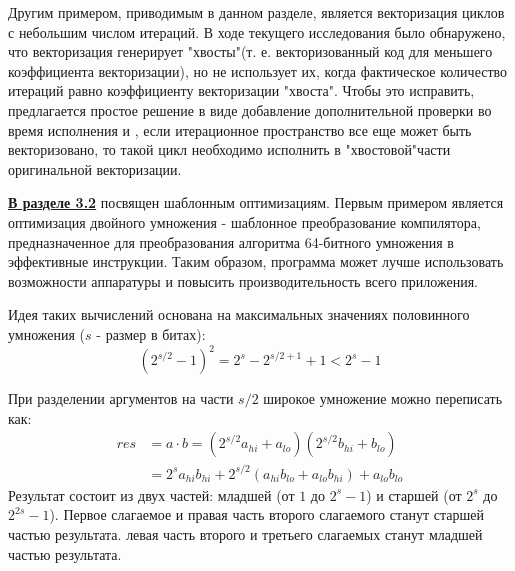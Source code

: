 Другим примером, приводимым в данном разделе, является  векторизация циклов с небольшим числом итераций.  В ходе текущего исследования было обнаружено, что векторизация
генерирует "хвосты"\phantom{ }(т. е. векторизованный код для меньшего коэффициента
векторизации), но не использует их, когда фактическое количество итераций
равно коэффициенту векторизации "хвоста".  Чтобы это исправить, предлагается простое решение в виде добавление дополнительной проверки во время исполнения и , если итерационное пространство все еще может быть векторизовано, то такой цикл необходимо исполнить в "хвостовой"\phantom{ }части оригинальной векторизации.

 \underline{\textbf{В разделе 3.2}} посвящен шаблонным  оптимизациям. Первым примером является оптимизация двойного умножения - шаблонное преобразование
 компилятора, предназначенное для преобразования алгоритма 64-битного умножения
 в эффективные инструкции. Таким образом, программа может лучше
 использовать возможности аппаратуры и повысить производительность всего
 приложения.
 
 Идея таких вычислений основана на максимальных значениях половинного умножения ($s$ - размер в битах):
 \begin{equation*} \label{eq1}
 	\left(2^{s/2}-1\right)^2=2^s-2^{s/2+1}+1<2^s-1
 \end{equation*}
 
 При разделении аргументов на части $s/2$ широкое умножение можно переписать как:
 \begin{equation*} \label{eq2}
 	\begin{split}
 		res& =a\cdot b =\left(2^{s/2}a_{hi}+a_{lo}\right)\left(2^{s/2}b_{hi}+b_{lo}\right) \\
 		& =2^sa_{hi}b_{hi}+2^{s/2}\left(a_{hi}b_{lo}+a_{lo}b_{hi}\right)+a_{lo}b_{lo}  
 	\end{split}
 \end{equation*}
 Результат состоит из двух частей: младшей (от $1$ до $2^s - 1$) и старшей (от $2^s$ до $2^{2s} -1$). Первое слагаемое  и правая часть второго слагаемого станут старшей частью результата. левая часть второго и третьего слагаемых станут младшей частью результата.
 
